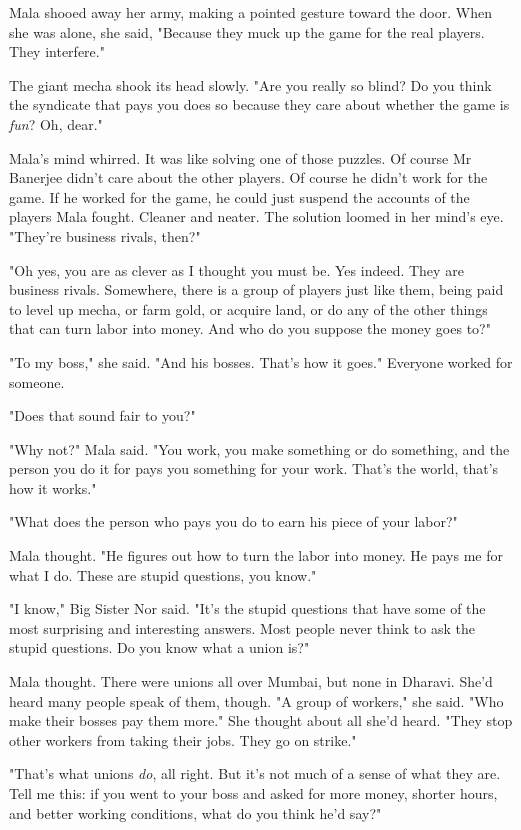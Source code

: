 Mala shooed away her army, making a pointed gesture toward the
door. When she was alone, she said, "Because they muck up the game
for the real players. They interfere."

The giant mecha shook its head slowly. "Are you really so blind? Do
you think the syndicate that pays you does so because they care
about whether the game is \emph{fun}? Oh, dear."

Mala's mind whirred. It was like solving one of those puzzles. Of
course Mr Banerjee didn't care about the other players. Of course
he didn't work for the game. If he worked for the game, he could
just suspend the accounts of the players Mala fought. Cleaner and
neater. The solution loomed in her mind's eye. "They're business
rivals, then?"

"Oh yes, you are as clever as I thought you must be. Yes indeed.
They are business rivals. Somewhere, there is a group of players
just like them, being paid to level up mecha, or farm gold, or
acquire land, or do any of the other things that can turn labor
into money. And who do you suppose the money goes to?"

"To my boss," she said. "And his bosses. That's how it goes."
Everyone worked for someone.

"Does that sound fair to you?"

"Why not?" Mala said. "You work, you make something or do
something, and the person you do it for pays you something for your
work. That's the world, that's how it works."

"What does the person who pays you do to earn his piece of your
labor?"

Mala thought. "He figures out how to turn the labor into money. He
pays me for what I do. These are stupid questions, you know."

"I know," Big Sister Nor said. "It's the stupid questions that have
some of the most surprising and interesting answers. Most people
never think to ask the stupid questions. Do you know what a union
is?"

Mala thought. There were unions all over Mumbai, but none in
Dharavi. She'd heard many people speak of them, though. "A group of
workers," she said. "Who make their bosses pay them more." She
thought about all she'd heard. "They stop other workers from taking
their jobs. They go on strike."

"That's what unions \emph{do}, all right. But it's not much of a
sense of what they are. Tell me this: if you went to your boss and
asked for more money, shorter hours, and better working conditions,
what do you think he'd say?"

